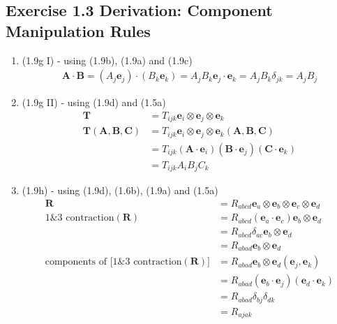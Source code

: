 \documentclass[../main.tex]{subfiles}
\begin{document}
\subsection{Exercise 1.3 Derivation: Component Manipulation Rules}
\begin{enumerate}
\item (1.9g I) - using (1.9b), (1.9a) and (1.9c)
\begin{align}
    \mathbf{A}\cdot\mathbf{B}
    =(A_j\mathbf{e}_j)\cdot(B_k\mathbf{e}_k)
    =A_jB_k\mathbf{e}_j\cdot\mathbf{e}_k
    =A_jB_k\delta_{jk}
    =A_jB_j
\end{align}
\item (1.9g II) - using (1.9d) and (1.5a)
\begin{align}
    \mathbf{T}&=T_{ijk}\mathbf{e}_i\otimes\mathbf{e}_j\otimes\mathbf{e}_k\\
    \mathbf{T}(\mathbf{A},\mathbf{B},\mathbf{C})
    &=T_{ijk}\mathbf{e}_i\otimes\mathbf{e}_j\otimes\mathbf{e}_k(\mathbf{A},\mathbf{B},\mathbf{C})\\
    &=T_{ijk}(\mathbf{A}\cdot\mathbf{e}_i)(\mathbf{B}\cdot\mathbf{e}_j)(\mathbf{C}\cdot\mathbf{e}_k)\\
    &=T_{ijk}A_iB_jC_k
\end{align}
\item (1.9h) - using (1.9d), (1.6b), (1.9a) and (1.5a)
\begin{align}
    \mathbf{R}
    &=R_{abcd}\mathbf{e}_a\otimes\mathbf{e}_b\otimes\mathbf{e}_c\otimes\mathbf{e}_d\\
    \text{1\&3 contraction}(\mathbf{R})
    &=R_{abcd}(\mathbf{e}_a\cdot\mathbf{e}_c) \mathbf{e}_b\otimes\mathbf{e}_d\\
    &=R_{abcd}\delta_{ac} \mathbf{e}_b\otimes\mathbf{e}_d\\
    &=R_{abad}\mathbf{e}_b\otimes\mathbf{e}_d\\
    \text{components of [1\&3 contraction}(\mathbf{R})]&=R_{abad}\mathbf{e}_b\otimes\mathbf{e}_d(\mathbf{e}_j,\mathbf{e}_k)\\
    &=R_{abad}(\mathbf{e}_b\cdot\mathbf{e}_j)(\mathbf{e}_d\cdot\mathbf{e}_k)\\
    &=R_{abad}\delta_{bj}\delta_{dk}\\
    &=R_{ajak}
\end{align}
\end{enumerate}
\end{document}
